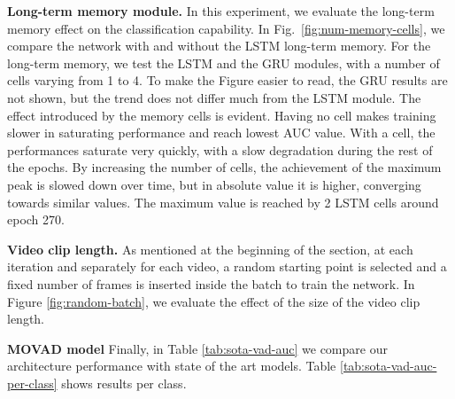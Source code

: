
\noindent\textbf{Long-term memory module.}
In this experiment, we evaluate the long-term memory effect on the classification capability.
In Fig.~\ref{fig:num-memory-cells}, we compare the network with and without the LSTM long-term memory.
For the long-term memory, we test the LSTM and the GRU modules, with a number of cells varying from 1 to 4.
To make the Figure easier to read, the GRU results are not shown, but the trend does not differ much from the LSTM module. 
The effect introduced by the memory cells is evident.
Having no cell makes training slower in saturating performance and reach lowest AUC value.
With a cell, the performances saturate very quickly, with a slow degradation during the rest of the epochs.
By increasing the number of cells, the achievement of the maximum peak is slowed down over time, but in absolute value it is higher, converging towards similar values.
The maximum value is reached by 2 LSTM cells around epoch 270.


\noindent\textbf{Video clip length.}
As mentioned at the beginning of the section, at each iteration and separately for each video, a random starting point is selected and a fixed number of frames is inserted inside the batch to train the network.
In Figure \ref{fig:random-batch}, we evaluate the effect of the size of the video clip length.

\noindent\textbf{MOVAD model}
Finally, in Table \ref{tab:sota-vad-auc} we compare our architecture performance with state of the art models.
Table \ref{tab:sota-vad-auc-per-class} shows results per class.
